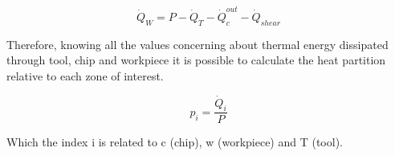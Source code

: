 		\begin{equation} 
		\label{eq_energybalance}
		\dot{Q}_{W} = P - \dot{Q}_{T} - \dot{Q}_{c}^{out} - \dot{Q}_{shear}
		\end{equation}

		Therefore, knowing all the values concerning about thermal energy dissipated through tool, chip and workpiece it is possible to calculate the heat partition relative to each zone of interest.

		\begin{equation} 
		\label{eq_heatpartition}
		p_{i} = \frac{\dot{Q}_{i}}{P}
		\end{equation}

		Which the index i is related to c (chip), w (workpiece) and T (tool).
	
